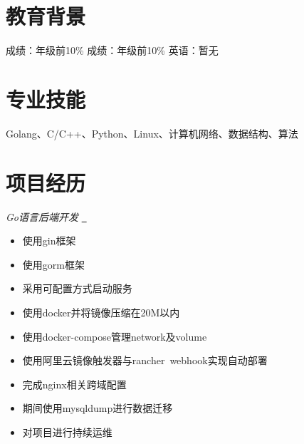 \documentclass{uniquecv}
\begin{document}
\medskip



\section{教育背景}
成绩：年级前10\%
成绩：年级前10\% \quad 英语：暂无



\section{专业技能}
\smallskip
Golang、C/C++、Python、Linux、计算机网络、数据结构、算法




\section{项目经历}

\textit{Go语言后端开发}
\quad \href{https://github.com/colinaaa/UniqueHackDayDashboard-backend}{{\color{gray}{\faLink}}~}
\vspace{0.4ex}

\begin{itemize}
  \item 使用gin框架
  \item 使用gorm框架
  \item 采用可配置方式启动服务
  \item 使用docker并将镜像压缩在20M以内
  \item 使用docker-compose管理network及volume
  \item 使用阿里云镜像触发器与rancher\ webhook实现自动部署
  \item 完成nginx相关跨域配置
  \item 期间使用mysqldump进行数据迁移
  \item 对项目进行持续运维
\end{itemize}
\end{document}
